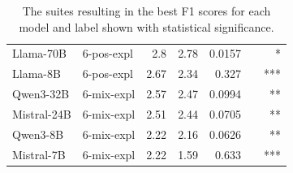 \begin{table}
\begin{tabular}{ll|rrrrr}
    \midrule
    Llama-70B & 6-pos-expl & 2.8 & 2.78 & 0.0157 &  & * \\
    Llama-8B & 6-pos-expl & 2.67 & 2.34 & 0.327 &  & *** \\
    Qwen3-32B & 6-mix-expl & 2.57 & 2.47 & 0.0994 &  & ** \\
    Mistral-24B & 6-mix-expl & 2.51 & 2.44 & 0.0705 &  & ** \\
    Qwen3-8B & 6-mix-expl & 2.22 & 2.16 & 0.0626 &  & ** \\
    Mistral-7B & 6-mix-expl & 2.22 & 1.59 & 0.633 &  & *** \\
    \bottomrule
    \end{tabular}

    \caption{The suites resulting in the best F1 scores for each model and label shown with statistical significance.}
    \label{tab:best_with_mcnemar}
\end{table}